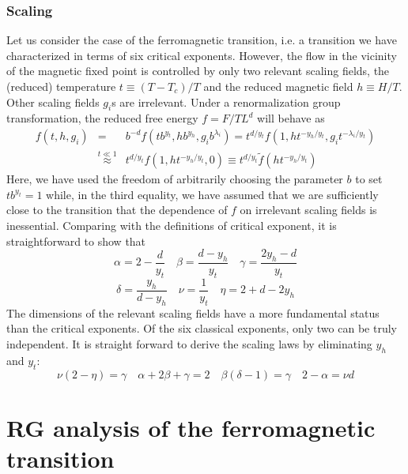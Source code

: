 \documentclass[cyan]{elegantnote}
\begin{document}
\subsubsection{Scaling}
Let us consider the case of the ferromagnetic transition, i.e. a transition we have characterized in terms of six critical exponents. 
However, the flow in the vicinity of the magnetic fixed point is controlled by only two relevant scaling fields, the (reduced) temperature $t \equiv (T-T_c)/T$ and the reduced magnetic field $h \equiv H/T$. Other scaling fields $g_i$s are irrelevant.
Under a renormalization group transformation, the reduced free energy $f = F/TL^d$ will behave as
\begin{eqnarray}
f(t,h,g_i) &=& b^{-d}f(tb^{y_t}, hb^{y_h},g_ib^{\lambda_i}) = t^{d/y_t} f(1,ht^{-y_h/y_t},g_it^{-\lambda_i/y_t}) \nonumber \\ 
&\overset{t\ll1}{\approx}& t^{d/y_t} f(1,ht^{-y_h/y_t},0) \equiv t^{d/y_t}\tilde{f}(ht^{-y_h/y_t}) \nonumber
\end{eqnarray}
Here, we have used the freedom of arbitrarily choosing the parameter $b$ to set $tb^{y_t} = 1$ while, in the third equality, we have assumed that we are sufficiently close to the transition that the dependence of $f$ on irrelevant scaling fields is inessential.
Comparing with the definitions of critical exponent, it is straightforward to show that
\[\alpha = 2 - \frac{d}{y_t} \quad \beta = \frac{d-y_h}{y_t} \quad \gamma = \frac{2y_h-d}{y_t} \]
\[\delta = \frac{y_h}{d - y_h} \quad \nu = \frac{1}{y_t} \quad \eta = 2 + d - 2y_h\]
The dimensions of the relevant scaling fields have a more fundamental status than the critical exponents.
Of the six classical exponents, only two can be truly
independent. It is straight forward to derive the scaling laws by eliminating $y_h$ and $y_t$:
\[\nu(2-\eta) = \gamma \quad \alpha + 2\beta + \gamma = 2 \quad \beta(\delta - 1) = \gamma \quad 2 - \alpha = \nu d\]

\section{RG analysis of the ferromagnetic transition}
\end{document}
